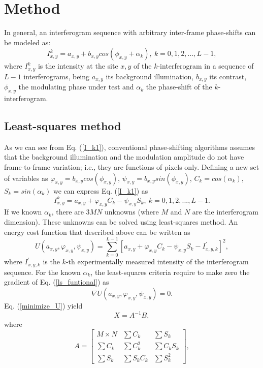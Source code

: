 \documentclass[letterpaper,12pt]{article}   %
\begin{document}
\section{Method}

In general, an interferogram sequence with arbitrary inter-frame phase-shifts can be modeled as: 
\begin{equation}\label{I_k1}
I_{x,y}^k=a_{x,y}+b_{x,y}cos(\phi_{x,y}+\alpha_k),\: k=0,1,2,...,L-1,
\end{equation}
where $I_{x,y}^k$ is the intensity at the site $x,y$ of the $k$-interferogram in a sequence of $L-1$ interferograms, being $a_{x,y}$ its background illumination, $b_{x,y}$ its contrast, $\phi_{x,y}$ the modulating phase under test and $\alpha_k$ the phase-shift of the $k$-interferogram.

\subsection{Least-squares method}
As we can see from Eq. (\ref{I_k1}), conventional phase-shifting algorithms assumes that the background illumination and the modulation amplitude do not have frame-to-frame variation; i.e., they are functions of pixels only. Defining a new set of variables as $\varphi_{x,y}=b_{x,y}cos(\phi_{x,y})$, $\psi_{x,y}=b_{x,y}sin(\phi_{x,y})$, $C_k=cos(\alpha_k)$, $S_k=sin(\alpha_k)$ we can express Eq. (\ref{I_k1}) as
\begin{equation}\label{I_k2}
I_{x,y}^k=a_{x,y}+\varphi_{x,y}C_k-\psi_{x,y}S_k,\: k=0,1,2,...,L-1.
\end{equation}
If we known $\alpha_k$, there are $3MN$ unknowns (where $M$ and $N$ are the interferogram dimension). These unknowns can be solved using least-squares method. An energy cost function that described above can be written as
\begin{equation}\label{ls_funtional}
U(a_{x,y},\varphi_{x,y},\psi_{x,y})=\sum_{k=0}^{L-1} [a_{x,y}+\varphi_{x,y}C_k-\psi_{x,y}S_k-I_{x,y,k}^{'}]^2,
\end{equation}
where $I_{x,y,k}^{'}$ is the $k$-th experimentally measured intensity of the interferogram sequence. For the known $\alpha_k$, the least-squares criteria require to make zero the gradient of Eq. (\ref{ls_funtional}) as
\begin{equation}\label{minimize_U}
\nabla U(a_{x,y},\varphi_{x,y},\psi_{x,y})=0.
\end{equation}
Eq. (\ref{minimize_U}) yield
\begin{equation}\label{x=AB}
X = A^{-1} B,
\end{equation}
where
\begin{equation}\label{A}
A = \left[ \begin{array}{ccc}
M\times N & \sum C_k     & \sum S_k \\
\sum C_k  & \sum C_k^2   & \sum C_k S_k \\
\sum S_k  & \sum S_k C_k & \sum S_k^2\end{array} \right],
\end{equation}
\end{document}
